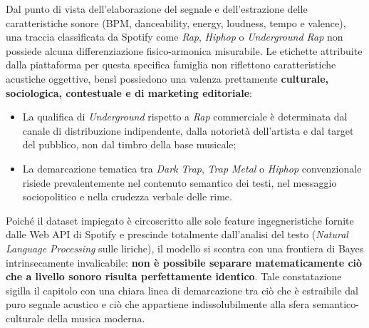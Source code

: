 Dal punto di vista dell'elaborazione del segnale e dell'estrazione delle caratteristiche sonore (BPM, danceability, energy, loudness, tempo e valence), una traccia classificata da Spotify come \textit{Rap}, \textit{Hiphop} o \textit{Underground Rap} non possiede alcuna differenziazione fisico-armonica misurabile. Le etichette attribuite dalla piattaforma per questa specifica famiglia non riflettono caratteristiche acustiche oggettive, bensì possiedono una valenza prettamente \textbf{culturale, sociologica, contestuale e di marketing editoriale}:
\begin{itemize}
    \item La qualifica di \textit{Underground} rispetto a \textit{Rap} commerciale è determinata dal canale di distribuzione indipendente, dalla notorietà dell'artista e dal target del pubblico, non dal timbro della base musicale;
    \item La demarcazione tematica tra \textit{Dark Trap}, \textit{Trap Metal} o \textit{Hiphop} convenzionale risiede prevalentemente nel contenuto semantico dei testi, nel messaggio sociopolitico e nella crudezza verbale delle rime.
\end{itemize}

Poiché il dataset impiegato è circoscritto alle sole feature ingegneristiche fornite dalle Web API di Spotify e prescinde totalmente dall'analisi del testo (\textit{Natural Language Processing} sulle liriche), il modello si scontra con una frontiera di Bayes intrinsecamente invalicabile: \textbf{non è possibile separare matematicamente ciò che a livello sonoro risulta perfettamente identico}. Tale constatazione sigilla il capitolo con una chiara linea di demarcazione tra ciò che è estraibile dal puro segnale acustico e ciò che appartiene indissolubilmente alla sfera semantico-culturale della musica moderna.

